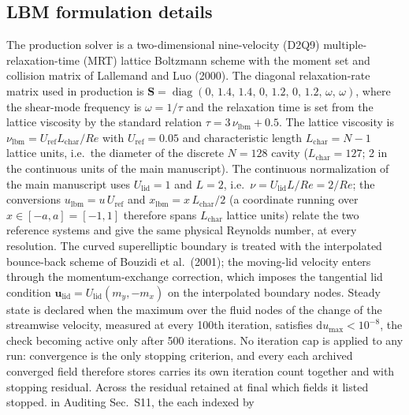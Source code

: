\documentclass[11pt]{article}
\begin{document}
\subsection{LBM formulation details}
The production solver is a two-dimensional nine-velocity (D2Q9) multiple-relaxation-time
(MRT) lattice Boltzmann scheme with the moment set and collision matrix of
Lallemand and Luo (2000). The diagonal relaxation-rate matrix used in
production is
$\mathbf{S}=\operatorname{diag}(0,\,1.4,\,1.4,\,0,\,1.2,\,0,\,1.2,\,\omega,\,\omega)$,
where the shear-mode frequency is $\omega=1/\tau$ and the relaxation time is
set from the lattice viscosity by the standard relation
$\tau=3\,\nu_{\mathrm{lbm}}+0.5$. The lattice viscosity is
$\nu_{\mathrm{lbm}}=U_{\mathrm{ref}}L_{\mathrm{char}}/Re$ with
$U_{\mathrm{ref}}=0.05$ and characteristic length $L_{\mathrm{char}}=N-1$
lattice units, i.e.\ the diameter of the discrete $N=128$ cavity
($L_{\mathrm{char}}=127$; 2 in the continuous units of the main manuscript).
The continuous normalization of the
main manuscript uses $U_{\mathrm{lid}}=1$ and $L=2$, i.e.\
$\nu=U_{\mathrm{lid}}L/Re=2/Re$; the conversions
$u_{\mathrm{lbm}}=u\,U_{\mathrm{ref}}$ and
$x_{\mathrm{lbm}}=x\,L_{\mathrm{char}}/2$ (a coordinate running over
$x\in[-a,a]=[-1,1]$ therefore spans $L_{\mathrm{char}}$ lattice units)
relate the two reference systems and
give the same physical Reynolds number, at every resolution. The curved superelliptic
boundary is treated with the interpolated bounce-back scheme of Bouzidi et
al.\ (2001); the moving-lid velocity enters through the momentum-exchange
correction, which imposes the tangential lid condition
$\mathbf{u}_{\mathrm{lid}}=U_{\mathrm{lid}}(m_y,-m_x)$ on the interpolated
boundary nodes. Steady state is declared when the maximum over the fluid
nodes of the change of the streamwise velocity, measured at every 100th
iteration, satisfies
$\mathrm{d}u_{\max}<10^{-8}$, the check becoming active only after 500
iterations. No iteration cap is applied to any run: convergence is the only
stopping criterion, and \color{revred}every \color{revblue}each\color{black} \color{revred}archived \color{revblue}converged\color{black} field therefore \color{revred}stores \color{revblue}carries\color{black} its own
iteration count \color{revred}together \color{revblue}and\color{black} \color{revred}with \color{revblue}stopping residual. Across\color{black} the \color{revred}residual \color{revblue}retained\color{black} \color{revred}at \color{revblue}final\color{black} \color{revred}which \color{revblue}fields\color{black} \color{revred}it \color{revblue}listed\color{black} \color{revred}stopped. \color{revblue}in\color{black} \color{revred}Auditing \color{revblue}Sec.~S11,\color{black} \color{revred}the \color{revblue}each indexed by\color{black}
\end{document}
